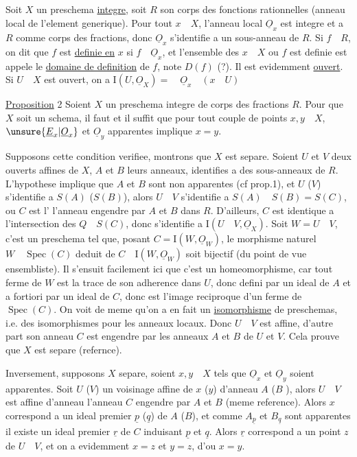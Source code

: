 Soit $X$ un preschema \uline{integre}, soit $R$ son corps des fonctions rationnelles (anneau local de l'element generique). Pour tout $x\quad X$,  l'anneau local $\underline O_x$ est integre et a $R$ comme corps des fractions, donc $\underline O_x$ s'identifie a un sous-anneau de $R$. Si $f\quad R$, on dit que $f$ est \uline{definie en} $x$ si $f\quad\underline O_x$, et l'ensemble des $x\quad X$ ou $f$ est definie est appele le \uline{domaine de definition} de $f$, note $D(f)$ (?). Il est evidemment \uline{ouvert}. Si $U\quad X$ est ouvert, on a $\mathrm I(U,\underline O_X)=\quad\underline O_x\quad(x\quad U)$

\uline{Proposition} 2 Soient $X$ un preschema integre de corps des fractions $R$. Pour que $X$ soit un schema, il faut et il suffit que pour tout couple de points $x,y\quad X$, $\unsure{\underline E_x|\underline O_x}$ et $\underline O_y$ apparentes implique $x=y$.

Supposons cette condition verifiee, montrons que $X$ est separe. Soient $U$ et $V$ deux ouverts affines de $X$, $A$ et $B$ leurs anneaux, identifies a des sous-anneaux de $R$. L'hypothese implique que $A$ et $B$ sont non apparentes (cf prop.1),  et $U$ ($V$) s'identifie a $S(A)$ ($S(B)$), alors $U\quad V$ s'identifie a $S(A)\quad S(B)=S(C)$, ou $C$ est l' l'anneau engendre par $A$ et $B$ dans $R$. D'ailleurs, $C$ est identique a l'intersection des $Q\quad S(C)$, donc s'identifie a $\mathrm I(U\quad V,\underline O_X)$. Soit $W=U\quad V$, c'est un preschema tel que, posant $C=\mathrm I(W,\underline O_W)$, le morphisme naturel $W\quad\operatorname{Spec}(C)$ deduit de $C\quad\mathrm I(W,\underline O_W)$ soit bijectif (du point de vue ensembliste). Il s'ensuit facilement ici que c'est un homeomorphisme, car tout ferme de $W$ est la trace de son adherence dans $U$, donc defini par un ideal de $A$ et a fortiori par un ideal de  $C$, donc est l'image reciproque d'un ferme de $\operatorname{Spec}(C)$. On voit de meme qu'on a en fait un \uline{isomorphisme} de preschemas, i.e. des isomorphismes pour les anneaux locaux. Donc $U\quad V$ est affine, d'autre part son anneau $C$ est engendre par les anneaux $A$ et $B$ de $U$ et $V$. Cela prouve que $X$ est separe (refernce).

Inversement, supposons $X$ separe, soient $x,y\quad X$ tels que $\underline O_x$ et $\underline O_y$ soient apparentes. Soit $U$ ($V$) un voisinage affine de $x$ ($y$) d'anneau $A$ ($B$ ), alors $U\quad V$ est affine d'anneau l'anneau $C$ engendre par $A$ et $B$ (meme reference).  Alors $x$ correspond a un ideal premier $\underline p$ ($\underline q$) de $A$ ($B$), et comme  $A_{\underline p}$ et $B_{\underline q}$ sont apparentes il existe un ideal premier $\underline r$ de $C$ induisant $\underline p$ et $\underline q$. Alors $\underline r$ correspond a un point $z$ de $U\quad V$, et on a evidemment $x=z$ et $y=z$, d'ou $x=y$.

